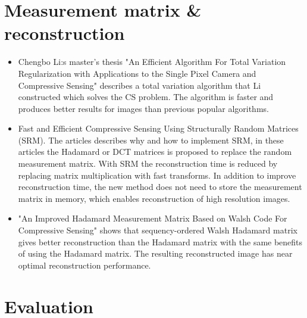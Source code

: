 \section{Measurement matrix \& reconstruction}

\begin{itemize}
    
\item \cite{article:TVAL3} Chengbo Li:s master's thesis "An Efficient Algorithm For Total Variation Regularization with Applications to the Single Pixel Camera and Compressive Sensing" describes a total variation algorithm that Li constructed which solves the CS problem. The algorithm is faster and produces better results for images than previous popular algorithms.   

\item \cite{article:SRM_short, article:SRM_long, article:SRM_block} Fast and Efficient Compressive Sensing Using Structurally Random Matrices (SRM). The articles describes why and how to implement SRM, in these articles the Hadamard or DCT matrices is proposed to replace the random measurement matrix. With SRM the reconstruction time is reduced by replacing matrix multiplication with fast transforms. In addition to improve reconstruction time, the new method does not need to store the measurement matrix in memory, which enables reconstruction of high resolution images. 

\item \cite{article:an_improved_WH_matrix} "An Improved Hadamard Measurement Matrix Based on Walsh Code For Compressive Sensing" shows that sequency-ordered Walsh Hadamard matrix gives better reconstruction than the Hadamard matrix with the same benefits of using the Hadamard matrix. The resulting reconstructed image has near optimal reconstruction performance.
	

\end{itemize}


\section{Evaluation}

